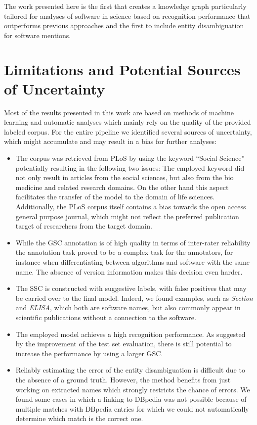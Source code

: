 \documentclass[runningheads]{llncs}
\begin{document}
The work presented here is the first that creates a knowledge graph particularly tailored for analyses of software in science based on recognition performance that outperforms previous approaches and the first to include entity disambiguation for software mentions.


\section{Limitations and Potential Sources of Uncertainty}\label{sec:limits}
Most of the results presented in this work are based on methods of machine learning and automatic analyses which mainly rely on the quality of the provided labeled corpus.
For the entire pipeline we identified several sources of uncertainty, which might accumulate and may result in a bias for further analyses:

\begin{itemize}
    
\item The corpus was retrieved from PLoS by using the keyword ``Social Science'' potentially resulting in the following two issues: The employed keyword did not only result in articles from the social sciences, but also from the bio medicine and related research domains. 
On the other hand this aspect facilitates the transfer of the model to the domain of life sciences.
Additionally, the PLoS corpus itself contains a bias towards the open access general purpose journal, which might not reflect the preferred publication target of researchers from the target domain.
    
\item While the GSC annotation is of high quality in terms of inter-rater reliability the annotation task proved to be a complex task for the annotators, for instance when differentiating between algorithms and software with the same name. 
The absence of version information makes this decision even harder.
    
\item The SSC is constructed with suggestive labels, with false positives that may be carried over to the final model.
Indeed, we found examples, such as \textit{Section} and \textit{ELISA}, which both are software names, but also commonly appear in scientific publications without a connection to the software. 

\item The employed model achieves a high recognition performance.
As suggested by the improvement of the test set evaluation, there is still potential to increase the performance by using a larger GSC.


\item Reliably estimating the error of the entity disambiguation is difficult due to the absence of a ground truth. 
However, the method benefits from just working on extracted names which strongly restricts the chance of errors. 
We found some cases in which a linking to DBpedia was not possible because of multiple matches with DBpedia entries for which we could not automatically determine which match is the correct one. 
\end{itemize}
\end{document}
